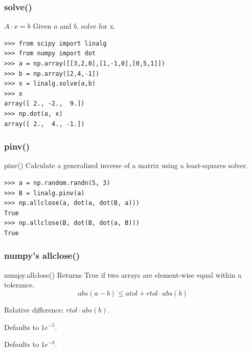 \documentclass[10pt,colorlinks]{beamer}
\begin{document}
\begin{frame}[fragile]\frametitle{solve()}
  \begin{block}{$A \cdot x = b$}
  Given $a$ and $b$, solve for x.
  \end{block}
\begin{verbatim}
>>> from scipy import linalg
>>> from numpy import dot
>>> a = np.array([[3,2,0],[1,-1,0],[0,5,1]])
>>> b = np.array([2,4,-1])
>>> x = linalg.solve(a,b)
>>> x
array([ 2., -2.,  9.])
>>> np.dot(a, x) 
array([ 2.,  4., -1.])
\end{verbatim}

\end{frame}

\begin{frame}[fragile]\frametitle{pinv()}
  \begin{block}{pinv()}
  Calculate a generalized inverse of a matrix using a least-squares solver.
  \end{block}
\begin{verbatim}
>>> a = np.random.randn(5, 3)
>>> B = linalg.pinv(a)
>>> np.allclose(a, dot(a, dot(B, a)))
True
>>> np.allclose(B, dot(B, dot(a, B)))
True
\end{verbatim}


\end{frame}


\begin{frame}[fragile]\frametitle{numpy's allclose() }
  \begin{block}{numpy.allclose()}
Returns True if two arrays are element-wise equal within a tolerance.
   \begin{equation}
    abs(a-b) \leq atol + rtol \cdot abs(b)
\end{equation}
\end{block}

\begin{description}
     \item  Relative difference: $rtol \cdot abs(b)$. 
     \item[rtol] Defaults to $1e^{-5}$.
    \item[atol] Defaults to $1e^{-8}$. 
\end{description}
\end{frame}
\end{document}
